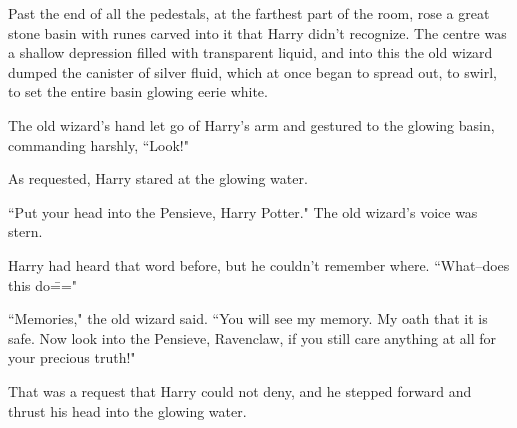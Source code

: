 Past the end of all the pedestals, at the farthest part of the room, rose a great stone basin with runes carved into it that Harry didn't recognize. The centre was a shallow depression filled with transparent liquid, and into this the old wizard dumped the canister of silver fluid, which at once began to spread out, to swirl, to set the entire basin glowing eerie white.

The old wizard's hand let go of Harry's arm and gestured to the glowing basin, commanding harshly, ``Look!"

As requested, Harry stared at the glowing water.

``Put your head into the Pensieve, Harry Potter." The old wizard's voice was stern.

Harry had heard that word before, but he couldn't remember where. ``What\---does this do\==="

``Memories," the old wizard said. ``You will see my memory. My oath that it is safe. Now look into the Pensieve, Ravenclaw, if you still care anything at all for your precious truth!"

That was a request that Harry could not deny, and he stepped forward and thrust his head into the glowing water.

\later

